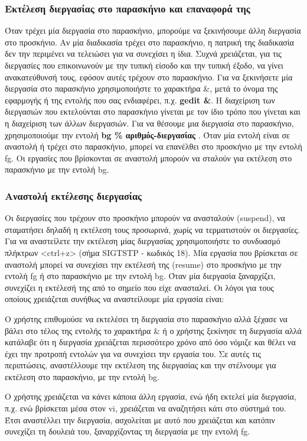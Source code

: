 \subsubsection{Εκτέλεση διεργασίας στο παρασκήνιο και επαναφορά της}


Όταν τρέχει μία διεργασία στο παρασκήνιο, μπορούμε να ξεκινήσουμε άλλη διεργασία στο προσκήνιο.  Αν μία διαδικασία τρέχει στο παρασκήνιο, η
πατρική της διαδικασία δεν την περιμένει να τελειώσει για να συνεχίσει η ίδια. Συχνά χρειάζεται, για τις διεργασίες που επικοινωνούν με την
τυπική είσοδο και την τυπική έξοδο, να γίνει ανακατεύθυνσή τους, εφόσον αυτές τρέχουν στο παρασκήνιο. Για να ξεκινήσετε μία διεργασία στο
παρασκήνιο χρησιμοποιήστε το χαρακτήρα \&, μετά το όνομα της εφαρμογής ή της εντολής που σας ενδιαφέρει, π.χ. \textbf{gedit \&}. Η
διαχείριση των διεργασιών που εκτελούνται στο παρασκήνιο γίνεται με τον ίδιο τρόπο που γίνεται και η διαχείριση των άλλων διεργασιών. Για να
θέσουμε μια διεργασία στο παρασκήνιο, χρησιμοποιούμε την εντολή \textbf{bg \% αριθμός-διεργασίας }. Όταν μία εντολή είναι σε αναστολή ή
τρέχει στο παρασκήνιο, μπορεί να επανέλθει στο προσκήνιο με την εντολή fg. Οι εργασίες που βρίσκονται σε αναστολή μπορούν να σταλούν για
εκτέλεση στο παρασκήνιο με την εντολή bg.


\subsubsection{Αναστολή εκτέλεσης διεργασίας}

Οι διεργασίες που τρέχουν στο προσκήνιο μπορούν να ανασταλούν (suspend), να  σταματήσει δηλαδή η εκτέλεση τους προσωρινά, χωρίς να
τερματιστούν οι διεργασίες. Για να αναστείλετε την εκτέλεση μίας διεργασίας χρησιμοποιήστε το συνδυασμό πλήκτρων <ctrl+z> (σήμα SIGTSTP -
κωδικός 18). Μία εργασία που βρίσκεται σε αναστολή μπορεί να συνεχίσει την εκτέλεσή της (resume) στο προσκήνιο με την εντολή fg ή στο
παρασκήνιο με την εντολή bg. Όταν μία διεργασία ξαναρχίζει, συνεχίζει η εκτέλεσή της από το σημείο που είχε ανασταλεί. Οι λόγοι για τους
οποίους χρειάζεται συνήθως να αναστείλουμε μία εργασία είναι:

\begin{packed_item}
	\item Ο χρήστης επιθυμούσε να εκτελέσει τη διεργασία στο παρασκήνιο αλλά ξέχασε να  βάλει στο τέλος της εντολής το χαρακτήρα \& ή ο χρήστης
	ξεκίνησε τη διεργασία αλλά κατάλαβε ότι η διεργασία χρειάζεται περισσότερο χρόνο από όσο νόμιζε και θέλει να έχει την προτροπή εντολών για
	να συνεχίσει την εργασία του. Σε αυτές τις περιπτώσεις, αναστέλλουμε την εκτέλεση της διεργασίας και την στέλνουμε για εκτέλεση στο
	παρασκήνιο, με την εντολή bg.
	\item Ο χρήστης χρειάζεται να κάνει κάποια άλλη εργασία, ενώ ήδη εκτελεί μία διεργασία, π.χ. ενώ βρίσκεται μέσα στον vi, χρειάζεται να
	αναζητήσει κάτι στο σύστημά του. Έτσι αναστέλλει την διεργασία, ασχολείται με αυτό που χρειάζεται και κατόπιν συνεχίζει τη δουλειά του,
	ξαναρχίζοντας τη διεργασία με την εντολή fg.
\end{packed_item}

